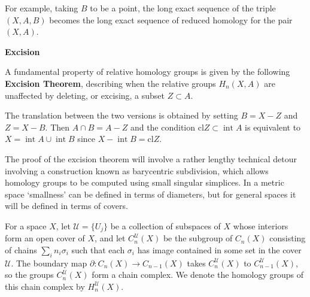 For example, taking $B$ to be a point, the long exact sequence of the triple $(X,A,B)$ becomes the long exact sequence of reduced homology for the pair $(X,A)$.

\textbf{Excision}

A fundamental property of relative homology groups is given by the following \textbf{Excision Theorem}, describing when the relative groups $H_n(X,A)$ are unaffected by deleting, or excising, a subset $Z \subset A$.

\begin{theorem}
\label{thm:excision-general}
The translation between the two versions is obtained by setting $B = X - Z$ and $Z = X - B$. Then $A \cap B = A - Z$ and the condition $\text{cl}Z \subset \operatorname{int}A$ is equivalent to $X = \operatorname{int}A \cup \operatorname{int}B$ since $X - \operatorname{int}B = \text{cl}Z$.
\end{theorem}



The proof of the excision theorem will involve a rather lengthy technical detour involving a construction known as barycentric subdivision, which allows homology groups to be computed using small singular simplices. In a metric space `smallness' can be defined in terms of diameters, but for general spaces it will be defined in terms of covers.

For a space $X$, let $\mathcal{U} = \{U_j\}$ be a collection of subspaces of $X$ whose interiors form an open cover of $X$, and let $C_n^{\mathcal{U}}(X)$ be the subgroup of $C_n(X)$ consisting of chains $\sum_i n_i\sigma_i$ such that each $\sigma_i$ has image contained in some set in the cover $\mathcal{U}$. The boundary map $\partial:C_n(X)\to C_{n-1}(X)$ takes $C_n^{\mathcal{U}}(X)$ to $C_{n-1}^{\mathcal{U}}(X)$, so the groups $C_n^{\mathcal{U}}(X)$ form a chain complex. We denote the homology groups of this chain complex by $H_n^{\mathcal{U}}(X)$.

